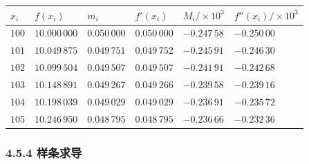 \documentclass[
  10pt,
  fontset=fandol]{ctexart}
\newcounter{none} %
\begin{document}
{\def\LTcaptype{none} %
\begin{longtable}[]{@{}
  >{\raggedleft\arraybackslash}p{}
  >{\raggedleft\arraybackslash}p{}
  >{\raggedleft\arraybackslash}p{}
  >{\raggedleft\arraybackslash}p{}
  >{\raggedleft\arraybackslash}p{}
  >{\raggedleft\arraybackslash}p{}@{}}
\toprule\noalign{}
\begin{minipage}[b]{\linewidth}\raggedleft
\(x_i\)
\end{minipage} & \begin{minipage}[b]{\linewidth}\raggedleft
\(f(x_i)\)
\end{minipage} & \begin{minipage}[b]{\linewidth}\raggedleft
\(m_i\)
\end{minipage} & \begin{minipage}[b]{\linewidth}\raggedleft
\(f'(x_i)\)
\end{minipage} & \begin{minipage}[b]{\linewidth}\raggedleft
\(M_i/\times10^3\)
\end{minipage} & \begin{minipage}[b]{\linewidth}\raggedleft
\(f''(x_i)/\times10^3\)
\end{minipage} \\
\midrule\noalign{}
\endhead
\bottomrule\noalign{}
\endlastfoot
\(100\) & \(10.000\,000\) & \(0.050\,000\) & \(0.050\,000\) & \(-0.247\,58\) & \(-0.250\,00\) \\
\(101\) & \(10.049\,875\) & \(0.049\,751\) & \(0.049\,752\) & \(-0.245\,91\) & \(-0.246\,30\) \\
\(102\) & \(10.099\,504\) & \(0.049\,507\) & \(0.049\,507\) & \(-0.241\,91\) & \(-0.242\,68\) \\
\(103\) & \(10.148\,891\) & \(0.049\,267\) & \(0.049\,266\) & \(-0.239\,58\) & \(-0.239\,16\) \\
\(104\) & \(10.198\,039\) & \(0.049\,029\) & \(0.049\,029\) & \(-0.236\,91\) & \(-0.235\,72\) \\
\(105\) & \(10.246\,950\) & \(0.048\,795\) & \(0.048\,795\) & \(-0.236\,66\) & \(-0.232\,36\) \\
\end{longtable}
}

\subsubsection{4.5.4 样条求导}\label{ux6837ux6761ux6c42ux5bfc}
\end{document}
